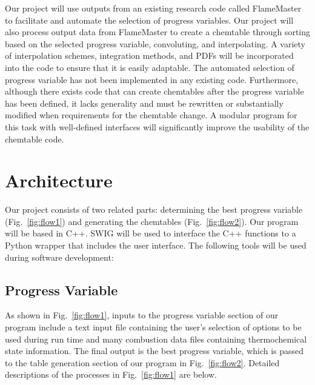 \documentclass[11pt]{article}
\begin{document}
Our project will use outputs from an existing research code called
FlameMaster to facilitate and automate the selection of progress
variables. Our project will also process output data from FlameMaster
to create a chemtable through sorting based on the selected progress
variable, convoluting, and interpolating. A variety of interpolation
schemes, integration methods, and PDFs will be incorporated into the
code to ensure that it is easily adaptable. The automated selection of
progress variable has not been implemented in any existing
code. Furthermore, although there exists code that can create
chemtables after the progress variable has been defined, it lacks
generality and must be rewritten or substantially modified when
requirements for the chemtable change. A modular program for this task
with well-defined interfaces will significantly improve the usability
of the chemtable code.

\section{Architecture}
Our project consists of two related parts: determining the best
progress variable (Fig.~\ref{fig:flow1}) and generating the chemtables
(Fig.~\ref{fig:flow2}). Our program will be based in C++. SWIG will be
used to interface the C++ functions to a Python wrapper that includes
the user interface. The following tools will be used during software
development:

\subsection{Progress Variable}
As shown in Fig.~\ref{fig:flow1}, inputs to the progress variable
section of our program include a text input file containing the user’s
selection of options to be used during run time and many combustion
data files containing thermochemical state information. The final
output is the best progress variable, which is passed to the table
generation section of our program in Fig.~\ref{fig:flow2}. Detailed
descriptions of the processes in Fig.~\ref{fig:flow1} are below.
\end{document}
